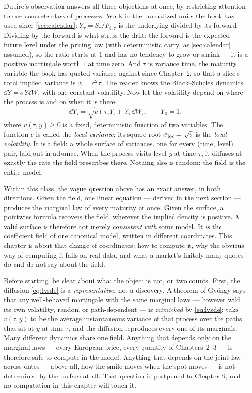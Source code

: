 Dupire's observation \citep{Dupire1994} answers all three objections at
once, by restricting attention to one concrete class of processes.
Work in the normalized units the book has used since
\cref{sec:calendar}: $Y_\tau=S_\tau/F_{0,\tau}$ is the underlying
divided by its forward.  Dividing by the forward is what strips the
drift: the forward is the expected future level under the pricing law
(with deterministic carry, as \cref{sec:calendar} assumed), so the
ratio starts at $1$ and has no tendency to grow or shrink --- it is a
positive martingale worth $1$ at time zero.  And $\tau$ is variance
time, the maturity variable the book has quoted variance against since
Chapter~2, so that a slice's total implied variance is
$w=\sigma^{2}\tau$.  The reader knows the Black--Scholes
dynamics $\dd Y=\sigma Y\dd W$, with one constant volatility.  Now let
the volatility depend on where the process is and on when it is there:
\begin{equation}
\dd Y_\tau=\sqrt{v(\tau,Y_\tau)}\;Y_\tau\,\dd W_\tau,\qquad Y_0=1,
\label{eq:lvsde}
\end{equation}
where $v(\tau,y)\ge0$ is a fixed, deterministic function of two
variables.  The function $v$ is called the \emph{local variance}; its
square root $\sigma_{\rm loc}=\sqrt v$ is the \emph{local volatility}.
It is a field: a whole surface of variances, one for every (time,
level) pair, laid out in advance.  When the process visits level $y$
at time $\tau$, it diffuses at exactly the rate the field prescribes
there.  Nothing else is random: the field is the entire model.

Within this class, the vague question above has an exact answer, in
both directions.  Given the field, one linear equation --- derived in
the next section --- produces the marginal law of every maturity at
once.  Given the surface, a pointwise formula recovers the field,
wherever the implied density is positive.  A valid surface is
therefore not merely \emph{consistent with} some model.  It \emph{is}
the coefficient field of one canonical model, written in different
coordinates.  This chapter is about that change of coordinates: how to
compute it, why the obvious way of computing it fails on real data,
and what a market's finitely many quotes do and do not say about the
field.

Before starting, be clear about what the object is not, on two counts.
First, the diffusion \eqref{eq:lvsde} is a \emph{representative}, not a
discovery.  A theorem of Gy\"ongy \citep{Gyongy1986} says that any
well-behaved martingale with the same marginal laws --- however wild
its own volatility, random or path-dependent --- is \emph{mimicked} by
\eqref{eq:lvsde}: take $v(\tau,y)$ to be the average instantaneous
variance of that process over the paths that sit at $y$ at time
$\tau$, and the diffusion reproduces every one of its marginals.  Many
different dynamics share one field.  Anything that depends only on the
marginal laws --- every European price, every quantity of
Chapters~2--3 --- is therefore safe to compute in the model.  Anything
that depends on the joint law across dates --- above all, how the
smile moves when the spot moves --- is not determined by the surface
at all.  That question is postponed to Chapter~9, and no computation
in this chapter will touch it.

